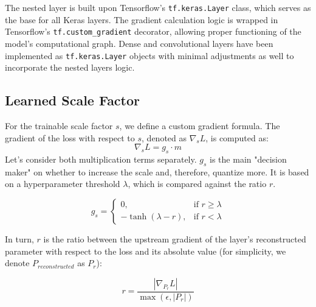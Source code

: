 \noindent The nested layer is built upon Tensorflow's \texttt{tf.keras.Layer} class,
which serves as the base for all Keras layers. The gradient calculation logic is wrapped
in Tensorflow's \texttt{tf.custom\_gradient} decorator, allowing proper functioning of the 
model's computational graph. Dense and convolutional layers have been implemented as 
\texttt{tf.keras.Layer} objects with minimal adjustments as well to incorporate the nested layers logic.


\subsection{Learned Scale Factor}
\label{subsec:learnedscalefactor}

For the trainable scale factor \( s \), we define a custom gradient formula. 
The gradient of the loss with respect to \( s \), denoted as \( \nabla_s L \), is computed as:
\[
\nabla_s L = g_s \cdot m
\]
Let's consider both multiplication terms separately. \(  g_s  \) is the main "decision maker" on whether to
increase the scale and, therefore, quantize more. It is based on a hyperparameter threshold  \(  \lambda  \),
which is compared against the ratio \(  r  \).

\[
g_s = 
\begin{cases} 
0, & \text{if } r \geq \lambda \\
- \tanh(\lambda - r), & \text{if } r < \lambda
\end{cases}
\]

\noindent In turn, \(  r  \) is the ratio between the upstream gradient of the layer's reconstructed parameter with respect to the loss
and its absolute value (for simplicity, we denote \( P_{reconstructed}\) as \(P_r\)):

\[
r = \frac{\left| \nabla_{P_{r}} L \right|}{\max(\epsilon, \left| P_r \right|)}
\]

